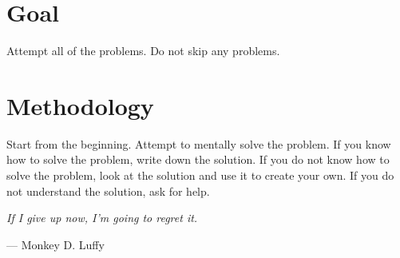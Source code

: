 \section*{Goal}
Attempt all of the problems. Do not skip any problems.

\section*{Methodology}
Start from the beginning. Attempt to mentally solve the problem. If you know how to solve the problem, write down the solution. If you do not know how to solve the problem, look at the solution and use it to create your own. If you do not understand the solution, ask for help.

\bigskip %
\epigraph{\textit{If I give up now, I’m going to regret it.}}{--- Monkey D. Luffy}
